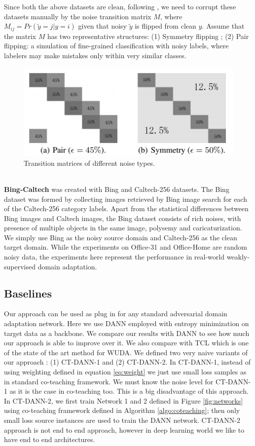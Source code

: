 Since both the above datasets are clean, following \cite{e43c87956bec4495a9f947cef8ea2780}, we need to corrupt these datasets manually by the noise transition matrix $M$, where $M_{ij} = Pr(\tilde{y} = j|y = i)$ given that noisy $\tilde{y}$ is flipped from clean $y$. Assume that the matrix $M$ has two representative structures: (1) Symmetry flipping \cite{10.5555/2969239.2969241};
(2) Pair flipping: a simulation of fine-grained classification with noisy labels, where labelers may make mistakes only within very similar classes.\\
\begin{figure}[ht]
            \centering
            \includegraphics[scale = 0.5]{noise.png}
            \caption{Transition matrices of different noise types.}
\label{fig:noise}
\end{figure}\\
\textbf{Bing-Caltech} \cite{bing-caltech} was created with Bing and Caltech-256 datasets. The Bing dataset was formed by collecting images retrieved by Bing image search for each of the Caltech-256 category labels. Apart from the statistical differences between Bing images and Caltech images, the Bing dataset consists of rich noises, with presence of multiple objects in the same image, polysemy and caricaturization. We simply use Bing as the noisy source domain and Caltech-256 as the clean target domain. While the experiments on Office-31 and Office-Home are random noisy
data, the experiments here represent the performance in real-world weakly-supervised domain adaptation.
\subsection{Baselines}
\label{subsec:baseline}
Our approach can be used as plug in for any standard adversarial domain adaptation network. Here we use DANN\cite{dann} employed with entropy minimization on target data as a backbone. We compare our results with DANN to see how much our approach is able to improve over it. We also compare with TCL \cite{tcl} which is one of the state of the art method for WUDA. We defined two very naive variants of our approach : (1) CT-DANN-1 and (2) CT-DANN-2. In CT-DANN-1, instead of using weighting defined in equation \ref{eq:weight} we just use small loss samples as in standard co-teaching framework. We must know the noise level for CT-DANN-1 as it is the case in co-teaching too. This is a big disadvantage of this approach. In CT-DANN-2, we first train Network 1 and 2 defined in Figure \ref{fig:networks} using co-teaching framework defined in Algorithm \ref{algo:coteaching}; then only small loss source instances are used to train the DANN network. CT-DANN-2 approach is not end to end approach, however in deep learning world we like to have end to end architectures.
